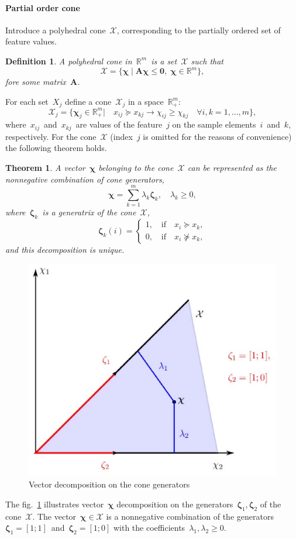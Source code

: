 \documentclass[12pt,preprint]{elsarticle}
\newcommand{\bA}{\mathbf{A}}
\newcommand{\bchi}{\boldsymbol{\chi}}
\newcommand{\bzeta}{\boldsymbol{\zeta}}
\newtheorem{Theorem}{Theorem}
\newtheorem{Def}{Definition}
\begin{document}
\paragraph{Partial order cone}
Introduce a polyhedral cone~$\mathcal{X}$, corresponding to the partially ordered set of feature values.
\begin{Def}
A polyhedral cone in~$\mathbb{R}^m$~is a set~$\mathcal{X}$ such that
\[
\mathcal{X}=\{\bchi\;|\;\bA\bchi\leq \mathbf{0},\;\bchi\in\mathbb{R}^m\},
\]
fore some matrix~$\bA$.
\end{Def}
For each set~$X_j$ define a cone~$\mathcal{X}_j$ in a space~$\mathbb{R}^m_+$:
\begin{equation}
\mathcal{X}_j=\{\bchi_j\in\mathbb{R}^m_+|\quad x_{ij}\succeq x_{kj}\rightarrow \chi_{ij}\geq \chi_{kj}\quad \forall i,k=1,...,m\},
\label{ConeDef}
\end{equation}
where~$x_{ij}$~and~$x_{kj}$~are values of the feature~$j$ on the sample elements~$i$~and~$k$, respectively.
For the cone~$\mathcal{X}$ (index~$j$ is omitted for the reasons of convenience) the following theorem holds.
\begin{Theorem}
A vector~$\bchi$ belonging to the cone~$\mathcal{X}$ can be represented as the nonnegative combination of cone generators,
$$\bchi=\sum\limits_{k=1}^{m}\lambda_{k}\bzeta_{k}, \quad\lambda_{k}\geq 0,$$
where~$\bzeta_k$~is a generatrix of the cone~$\mathcal{X}$,
\[
\bzeta_{k}(i)=
\begin{cases}
1,\quad \text{if}\quad x_i\succeq x_k,\\
0,\quad\text{if}\quad x_i\nsucceq x_k,
\end{cases}
\]
and this decomposition is unique.
\label{thConeGen}
\end{Theorem}
\begin{figure}[h]
\begin{center}
\includegraphics[width=.6\textwidth]{coneTheorem.eps}
\caption{Vector decomposition on the cone generators}
\label{fig:ConeTheorem}
\end{center}
\end{figure}
The fig.~\ref{fig:ConeTheorem} illustrates vector~$\bchi$ decomposition on the generators~$\bzeta_1,\bzeta_2$ of the cone~$\mathcal{X}$. The vector~$\bchi\in \mathcal{X}$ is a nonnegative combination of the generators~$\bzeta_1=[1;1]$~and~$\bzeta_2=[1;0]$ with the coefficients~$\lambda_1,\lambda_2\geq 0$.
\end{document}
